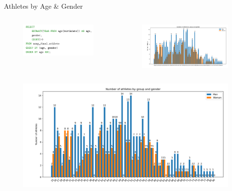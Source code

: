 \documentclass[aspectratio=169, xcolor=dvipsnames]{beamer}
\begin{document}
\begin{frame}{Athletes by Age \& Gender}
\begin{columns}[c]
\begin{column}{.5\textwidth}
\begin{figure}
    \centering
    \includegraphics[width=\textwidth]{img/sql/ageandgender.png}
\end{figure}
\end{column}

\begin{column}{.5\textwidth}
\begin{figure}
    \centering
    \includegraphics[width=\textwidth]{img/athletesbyageandgender.png}
\end{figure}
\end{column}
\end{columns}
\end{frame}

\begin{frame}
\begin{figure}
    \centering
    \includegraphics[width=\textwidth]{img/athletesbyageandgender.png}
\end{figure}
\end{frame}
\end{document}
